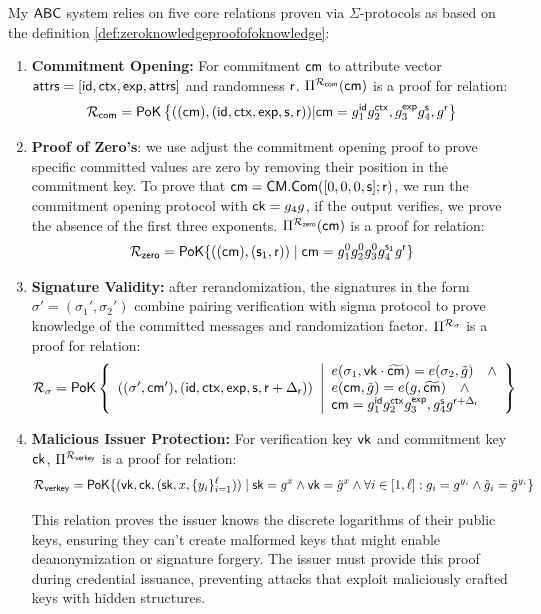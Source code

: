 My $\mathsf{ABC}$ system relies on five core relations proven via $\Sigma$-protocols as based on the definition \ref{def:zeroknowledgeproofofoknowledge}:
\begin{enumerate}
    \item \textbf{Commitment Opening:} For commitment $\mathsf{cm}$ to attribute vector $\mathsf{attrs}  = [\mathsf{id}, \mathsf{ctx}, \mathsf{exp}, \mathsf{attrs}]$ and randomness $\mathsf{r}$. $\Pi^{\mathcal{R}_{\mathsf{com}}}(\mathsf{cm})$ is a proof for relation:
    \[
     {\mathcal{R}_{\mathsf{com}}} = {\mathsf{PoK}} \left\{((\mathsf{cm}), (\mathsf{id}, \mathsf{ctx}, \mathsf{exp}, \mathsf{s}, \mathsf{r}))| \mathsf{cm} = g_1^{\mathsf{id}}g_2^{\mathsf{ctx}},g_3^{\mathsf{exp}}g_4^{\mathsf{s}}, g^{\mathsf{r}} \right\}
    \]

     \item \textbf{Proof of Zero's}: we use adjust the commitment opening proof to prove specific committed values are zero by removing their position in the commitment key. To prove that $\mathsf{cm}=\mathsf{CM.Com}([0,0,0,\mathsf{s}];\mathsf{r})$, we run the commitment opening protocol with $\mathsf{ck} = g_4g$, if the output verifies, we prove the absence of the first three exponents.
     $\Pi^{\mathcal{R}_{\mathsf{zero}}}(\mathsf{cm})$ is a proof for relation: 
    \[
    {\mathcal{R}_{\mathsf{zero}}} = {\mathsf{PoK}} \{((\mathsf{cm}),(\mathsf{s}_1, \mathsf{r})) \mid \mathsf{cm} = g_1^0g_2^0g_3^0g_4^{\mathsf{s}_1}g^{\mathsf{r}} \}
    \]
     
    
    \item \textbf{Signature Validity:} after rerandomization, the signatures in the form $\sigma' = (\sigma_1', \sigma_2')$ combine pairing verification with sigma protocol to prove knowledge of the committed messages and randomization factor. $\Pi^{\mathcal{R}_{\sigma}}$ is a proof for relation:
         \[
    {\mathcal{R}_{\sigma}} = {\mathsf{PoK}} \left\{ 
    \begin{array}{l} 
    ((\sigma', \mathsf{cm}'), (\mathsf{id}, \mathsf{ctx}, \mathsf{exp}, \mathsf{s}, \mathsf{r} + \Delta_{\mathsf{r}})) \\
    \end{array} 
    \middle|
    \begin{array}{l}
    e(\sigma_1, \mathsf{vk} \cdot \widetilde{\mathsf{cm}}) = e(\sigma_2, \tilde{g}) \quad \wedge \\
    e(\mathsf{cm}, \tilde{g}) = e(g, \widetilde{\mathsf{cm}}) \quad \wedge\\
    \mathsf{cm} = g_1^{\mathsf{id}}g_2^{\mathsf{ctx}}g_3^{\mathsf{exp}},g_4^{\mathsf{s}} g^{\mathsf{r} + \Delta_{\mathsf{r}}} \\
    \end{array} 
    \right\}
    \]


    \item \textbf{Malicious Issuer Protection:} For verification key $\mathsf{vk}$ and commitment key $\mathsf{ck}$, $\Pi^{\mathcal{R}_{\mathsf{verkey}}}$ is a proof for relation:
    \[
    \mathcal{R}_{\mathsf{verkey}} = {\mathsf{PoK}} \{(\mathsf{vk}, \mathsf{ck}, (\mathsf{sk}, x, \{y_i\}_{i=1}^{\ell})) \mid \mathsf{sk} = g^x \wedge \mathsf{vk} = \tilde{g}^x \wedge 
    \forall i \in [1,\ell]: g_i = g^{y_i} \wedge \tilde{g}_i = \tilde{g}^{y_i} \}
    \]
    
    This relation proves the issuer knows the discrete logarithms of their public keys, ensuring they can't create malformed keys that might enable deanonymization or signature forgery. The issuer must provide this proof during credential issuance, preventing attacks that exploit maliciously crafted keys with hidden structures.     

\end{enumerate}



